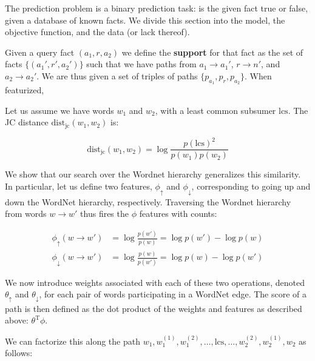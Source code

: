 \documentclass[11pt,a4paper]{article}
\begin{document}

The prediction problem is a binary prediction task: is the given fact true
  or false, given a database of known facts.
We divide this section into the model, the objective function, and the
  data (or lack thereof).

Given a query fact $(a_1, r, a_2)$ we define the \textbf{support} for that
  fact as the set of facts $\{ (a_1', r', a_2') \}$ such that we have
  paths from $a_1 \rightarrow a_1'$, $r \rightarrow n'$,
  and $a_2 \rightarrow a_2'$.
We are thus given a set of triples of paths $\{p_{a_1}, p_{r}, p_{a_2}\}$.
When featurized, 



Let us assume we have words $w_1$ and $w_2$, with a least common subsumer $\textrm{lcs}$.
The JC distance $\textrm{dist}_{\textrm{jc}}(w_1, w_2)$ is:

\begin{equation}
\textrm{dist}_{\textrm{jc}}(w_1, w_2)
  = \log\frac{p(\textrm{lcs})^2}{p(w_1)p(w_2)}
\end{equation}

We show that our search over the Wordnet hierarchy generalizes this similarity.
In particular, let us define two features, $\phi_\uparrow$ and $\phi_\downarrow$,
  corresponding to going up and down the WordNet hierarchy, respectively.
Traversing the Wordnet hierarchy from words $w \rightarrow w'$ thus fires the $\phi$
  features with counts:

\begin{align}
  \phi_\uparrow(w \rightarrow w')
    &= \log\frac{p(w')}{p(w)} = \log p(w') - \log p(w) \\
  \phi_\downarrow(w \rightarrow w')
    &= \log\frac{p(w)}{p(w')} = \log p(w) - \log p(w') 
\end{align}

We now introduce weights associated with each of these two operations, denoted
  $\theta_\uparrow$ and $\theta_\downarrow$, for each pair of words participating
  in a WordNet edge.
The score of a path is then defined as the dot product of the weights and features
  as described above: $\theta^{\textrm{T}}\phi$.

We can factorize this along the path
  $w_1, w_1^{(1)}, w_1^{(2)}, \dots, \textrm{lcs}, \dots, w_2^{(2)},  w_2^{(1)}, w_2$
  as follows:
\end{document}
